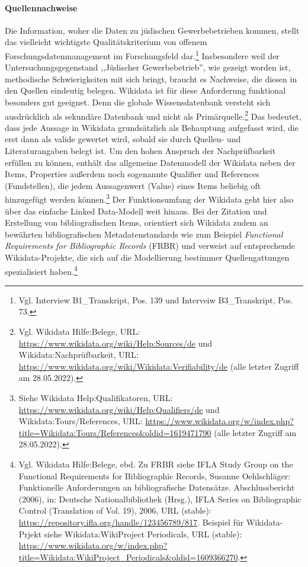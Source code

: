 \paragraph{Quellennachweise}

Die Information, woher die Daten zu jüdischen Gewerbebetrieben kommen, stellt das vielleicht wichtigste Qualitätskriterium von offenem Forschungsdatenmanagement im Forschungsfeld dar.\footnote{Vgl. Interview B1\_Transkript, Pos. 139 und Interveiw B3\_Transkript, Pos. 73.} Insbesondere weil der Untersuchungsgegenstand ,,Jüdischer Gewerbebetrieb'', wie gezeigt worden ist, methodische Schwierigkeiten mit sich bringt, braucht es Nachweise, die diesen in den Quellen eindeutig belegen. Wikidata ist für diese Anforderung funktional besonders gut geeignet. Denn die globale Wissensdatenbank versteht sich ausdrücklich als sekundäre Datenbank und nicht als Primärquelle.\footnote{Vgl. Wikidata Hilfe:Belege, URL: \url{https://www.wikidata.org/wiki/Help:Sources/de} und Wikidata:Nachprüfbarkeit, URL: \url{https://www.wikidata.org/wiki/Wikidata:Verifiability/de} (alle letzter Zugriff am 28.05.2022).} Das bedeutet, dass jede Aussage in Wikidata grundsätzlich als Behauptung aufgefasst wird, die erst dann als valide gewertet wird, sobald sie durch Quellen- und Literaturangaben belegt ist. Um den hohen Anspruch der Nachprüfbarkeit erfüllen zu können, enthält das allgemeine Datenmodell der Wikidata neben der Items, Properties außerdem noch sogenannte Qualifier und References (Fundstellen), die jedem Aussagenwert (Value) eines Items beliebig oft hinzugefügt werden können.\footnote{Siehe Wikidata Help:Qualifikatoren, URL: \url{https://www.wikidata.org/wiki/Help:Qualifiers/de} und Wikidata:Tours/References, URL: \url{https://www.wikidata.org/w/index.php?title=Wikidata:Tours/References&oldid=1619471790} (alle letzter Zugriff am 28.05.2022).} Der Funktionsumfang der Wikidata geht hier also über das einfache Linked Data-Modell weit hinaus. Bei der Zitation und Erstellung von bibliografischen Items, orientiert sich Wikidata zudem an bewährten bibliografischen Metadatenstandards wie zum Beispiel \textit{Functional Requirements for Bibliographic Records} (FRBR) und verweist auf entsprechende Wikidata-Projekte, die sich auf die Modellierung bestimmer Quellengattungen spezialisiert haben.\footnote{Vgl. Wikidata Hilfe:Belege, ebd. Zu FRBR siehe IFLA Study Group on the Functional Requirements for Bibliographic Records, Susanne Oehlschläger: Funktionelle Anforderungen an bibliografische Datensätze. Abschlussbericht (2006), in: Deutsche Nationalbibliothek (Hrsg.), IFLA Series on Bibliographic Control (Translation of Vol. 19), 2006, URL (stable): \url{https://repository.ifla.org/handle/123456789/817}. Beispiel für Wikidata-Prjekt siehe Wikidata:WikiProject Periodicals, URL (stable): \url{https://www.wikidata.org/w/index.php?title=Wikidata:WikiProject_Periodicals&oldid=1609366270}.} 

